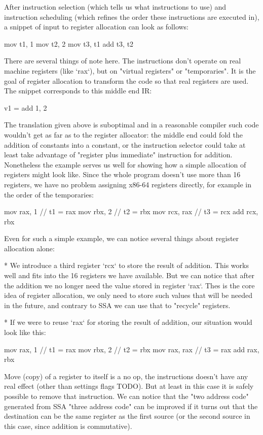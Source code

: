 After instruction selection (which tells us what instructions to use) and
instruction scheduling (which refines the order these instructions are executed
in), a snippet of input to register allocation can look as follows:

\begtt
mov t1, 1
mov t2, 2
mov t3, t1
add t3, t2
\endtt

There are several things of note here. The instructions don't operate on real
machine registers (like `rax`), but on "virtual registers" or "temporaries". It
is the goal of register allocation to transform the code so that real registers
are used. The snippet corresponds to this middle end IR:

\begtt
v1 = add 1, 2
\endtt

The translation given above is suboptimal and in a reasonable compiler such code
wouldn't get as far as to the register allocator: the middle end could fold the
addition of constants into a constant, or the instruction selector could take at
least take advantage of "register plus immediate" instruction for addition.
Nonetheless the example serves us well for showing how a simple allocation of
registers might look like. Since the whole program doesn't use more than 16
registers, we have no problem assigning x86-64 registers directly, for example
in the order of the temporaries:

\begtt
mov rax, 1   // t1 = rax
mov rbx, 2   // t2 = rbx
mov rcx, rax // t3 = rcx
add rcx, rbx
\endtt

Even for such a simple example, we can notice several things about register
allocation alone:

\begitems
 * We introduce a third register `rcx` to store the result of addition. This
works well and fits into the 16 registers we have available. But we can notice
that after the addition we no longer need the value stored in register `rax`.
Thes is the core idea of register allocation, we only need to store such values
that will be needed in the future, and contrary to SSA we can use that to
"recycle" registers.

* If we were to reuse `rax` for storing the result of addition, our situation
would look like this:

\begtt
mov rax, 1   // t1 = rax
mov rbx, 2   // t2 = rbx
mov rax, rax // t3 = rax
add rax, rbx
\endtt

Move (copy) of a register to itself is a no op, the instructions doesn't have
any real effect (other than settings flags TODO). But at least in this case it
is safely possible to remove that instruction. We can notice that the "two
address code" generated from SSA "three address code" can be improved if it
turns out that the destination can be the same register as the first source (or
the second source in this case, since addition is commutative).

